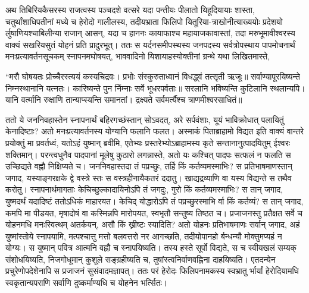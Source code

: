 \adhyAya
{}
\vakya अथ तिबिरियकैसरस्य राजत्वस्य पञ्चदशे वत्सरे यदा पन्तीयः पीलातो यिहूदियायाः शास्ता, चतुर्थांशाधिपतीनां मध्ये च हेरोदो गालीलस्य, तदीयभ्राता फिलिपो यितूरिया-त्राखोनीत्याख्ययोः प्रदेशयो र्लुषाणियश्चाबिलीन्या राजान् आसन्,
\vakya यदा च हाननः कायाफाश्च महायाजकावास्तां, तदा मरुभूमावीश्वरस्य वाक्यं सखरियसुतं योहनं प्रति प्रादुरभूत्।
\vakya ततः स यर्दनसमीपस्थस्य जनपदस्य सर्वत्रोपस्थाय पापमोचनार्थं मनःप्रत्यावर्तनसूचकम् स्नापनमघोषयत्,
\vakya भाववादिनो यिशायाहस्योक्तीनां ग्रन्थे यथा लिखितमास्ते,
\begin{poem}
\startwithline “मरौ घोषयतः प्रोच्चैरस्त्ययं कस्यचिद्रवः।
\pline प्रभोः संस्कुरुताध्वानं विधद्ध्वं तत्सृती ऋजूः॥
\pline सर्वाण्यापूरयिष्यन्ते निम्नस्थानानि यत्नतः।
\vakya कारिष्यन्ते पुन र्निम्नाः सर्वे भूधरपर्वताः॥
\pline सरलानि भविष्यन्ति कुटिलानि स्थलान्यपि।
\pline यानि वर्त्मानि रुक्षाणि तान्याप्स्यन्ति समानतां।
\vakya द्रक्ष्यते सर्वमर्त्यैश्च त्राणमीश्वरसाधितं॥
\end{poem}
\vakya ततो ये जननिवहास्तेन स्नापनार्थं बहिरगच्छंस्तान् सोऽवदत्, अरे सर्पवंशाः, यूयं भाविक्रोधात् पलायितुं केनादिष्टाः?
\vakya अतो मनःप्रत्यावर्तनस्य योग्यानि फलानि फलत। अस्माकं पिताब्राहामो विद्यत इति वाक्यं वान्तरे प्रयोक्तुं मा प्रवर्तध्वं, यतोऽहं युष्मान् ब्रवीमि, एतेभ्यः प्रस्तरेभ्योऽब्राहामस्य कृते सन्तानानुत्पादयितुम् ईश्वरः शक्तिमान्।
\vakya परन्त्वधुनैव पादपानां मूलेषु कुठारो लगन्नास्ते, अतो यः कश्चित् पादपः सत्फलं न फलति स उच्छिद्यते वह्नौ निक्षिप्यते च।
\vakya जननिवहास्तदा तं पप्रच्छुः, तर्हि किं कर्तव्यमस्माभिः?
\vakya स प्रतिभाषमाणस्तान् जगाद, यस्याङ्गरक्षके द्वे वस्त्रे स्तः स वस्त्रहीनायैकतरं ददातु। खाद्यद्रव्याणि वा यस्य विद्यन्ते स तथैव करोतु।
\vakya स्नापनार्थमागताः केचिच्छुल्कादायिनोऽपि तं जगदुः, गुरो किं कर्तव्यमस्माभिः?
\vakya स तान् जगाद, युष्मदर्थं यदादिष्टं ततोऽधिकं माहारयत।
\vakya केचिद् योद्धारोऽपि तं पप्रच्छुरस्माभि र्वा किं कर्तव्यं? स तान् जगाद, कमपि मा पीडयत, मृषादोषं वा कस्मिन्नपि मारोपयत, स्वभृतौ सन्तुष्य तिष्ठत च।
\vakya प्रजाजनस्तु प्रतैक्षत सर्वे च योहनमधि मनःस्वित्थम् अतर्कयन्, असौ किं ख्रीष्टः स्यादिति?
\vakya अतो योहनः प्रतिभाषमाणः सर्वान् जगाद, अहं युष्मांस्तोये स्नापयामि, मत्पश्चात्तु मत्तो बलवत्तरो नर आगच्छति, तदीयोपानहो र्बन्धन्यौ मोक्तुमप्यहं न योग्यः। स युष्मान् पवित्र आत्मनि वह्नौ च स्नापयिष्यति।
\vakya तस्य हस्ते सूर्पो विद्यते, स च स्वीयखलं सम्यक् संशोधयिष्यति, निजगोधूमान् कुशूले सङ्ग्रहीष्यति च, तुषांस्त्वनिर्वाणवह्निना दाहयिष्यति।
\vakya एतदन्येन प्रचुरेणोपदेशेनापि स प्रजाजनं सुसंवादमज्ञापत्।
\vakya ततः परं हेरोदः फिलिपनामकस्य स्वभ्रातु र्भार्यां हेरोदियामधि स्वकृतान्यपराणि सर्वाणि दुष्कर्माण्यधि च योहनेन भर्त्सितः।
